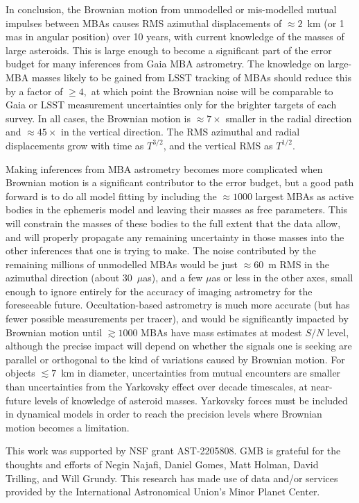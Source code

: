 \documentclass[linenumbers, onecolumn]{aastex631}
\newcommand\edited[1]{{\color{blue} {#1}}}
\begin{document}
In conclusion, the Brownian motion from unmodelled or mis-modelled
mutual impulses between MBAs causes RMS azimuthal displacements of
$\approx2$~km (or 1 mas in angular position) over 10 years, with
current knowledge of the masses of large asteroids.  This is large
enough to become a significant part of the error budget for many
inferences from Gaia MBA astrometry.  The knowledge on large-MBA
masses likely to be gained from LSST tracking of MBAs should reduce
this by a factor of $\ge4,$ at which point the Brownian noise will be
comparable to Gaia or LSST measurement uncertainties only for the
brighter targets of each survey.  In all cases, the Brownian motion is
$\approx7\times$ smaller in the radial direction and $\approx45\times$
in the vertical direction.  The RMS azimuthal and radial displacements
grow with time as $T^{3/2}$, and the vertical RMS as $T^{1/2}.$

Making inferences from MBA astrometry becomes more complicated when
Brownian motion is a significant contributor to the error budget, but
a good path forward is to do all model fitting by including the
$\approx1000$ largest MBAs as active bodies in the ephemeris model and
leaving their masses as free parameters.  This will constrain the
masses of these bodies to the full extent that the data allow, and
will properly propagate any remaining uncertainty in those masses into
the other inferences that one is trying to make.  The noise
contributed by the remaining millions of unmodelled MBAs would be just
$\approx60$~m RMS in the azimuthal direction (about 30~$\mu$as), and a
few $\mu$as or less in the other axes, small enough to ignore entirely
for the accuracy of imaging astrometry for the foreseeable future.
Occultation-based astrometry is much more accurate (but has fewer
possible measurements per tracer), and would be significantly impacted
by Brownian motion until $\gtrsim1000$ MBAs have mass estimates at
modest $S/N$ level, although the precise impact will depend on whether
the signals one is seeking are parallel or orthogonal to the kind of
variations caused by Brownian motion.  \edited{For objects
  $\lesssim7$~km in diameter, uncertainties from mutual encounters are
  smaller than uncertainties from the Yarkovsky effect over decade
  timescales, at near-future levels of knowledge of asteroid masses.
  Yarkovsky forces must be included in dynamical models in order to
  reach the precision levels where Brownian motion becomes a limitation.}


\begin{acknowledgments}
  This work was supported by NSF grant AST-2205808.  GMB is grateful for
  the thoughts and efforts of Negin Najafi, Daniel Gomes, Matt Holman,
  David Trilling, and Will Grundy.
  This research has made use of data and/or services provided by the International Astronomical Union's Minor Planet Center. 
\end{acknowledgments}

\newpage


\end{document}
